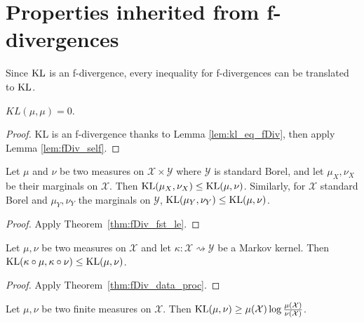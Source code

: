 \section{Properties inherited from f-divergences}

Since $\operatorname{KL}$ is an f-divergence, every inequality for f-divergences can be translated to $\operatorname{KL}$.

\begin{lemma}
  \label{lem:kl_self}
  \leanok
  $KL(\mu, \mu) = 0$.
\end{lemma}

\begin{proof} \leanok
  KL is an f-divergence thanks to Lemma \ref{lem:kl_eq_fDiv}, then apply Lemma \ref{lem:fDiv_self}.
\end{proof}

\begin{theorem}[Marginals]
  \label{thm:kl_fst_le}
  Let $\mu$ and $\nu$ be two measures on $\mathcal X \times \mathcal Y$ where $\mathcal Y$ is standard Borel, and let $\mu_X, \nu_X$ be their marginals on $\mathcal X$.
  Then $\operatorname{KL}(\mu_X, \nu_X) \le \operatorname{KL}(\mu, \nu)$.
  Similarly, for $\mathcal X$ standard Borel and $\mu_Y, \nu_Y$ the marginals on $\mathcal Y$, $\operatorname{KL}(\mu_Y, \nu_Y) \le \operatorname{KL}(\mu, \nu)$.
\end{theorem}

\begin{proof}
Apply Theorem~\ref{thm:fDiv_fst_le}.
\end{proof}

\begin{theorem}
  \label{thm:kl_data_proc}
  Let $\mu, \nu$ be two measures on $\mathcal X$ and let $\kappa : \mathcal X \rightsquigarrow \mathcal Y$ be a Markov kernel.
  Then $\operatorname{KL}(\kappa \circ \mu, \kappa \circ \nu) \le \operatorname{KL}(\mu, \nu)$.
\end{theorem}

\begin{proof}
Apply Theorem~\ref{thm:fDiv_data_proc}.
\end{proof}

\begin{lemma}
  \label{lem:kl_ge}
  \leanok
  Let $\mu, \nu$ be two finite measures on $\mathcal X$. Then $\operatorname{KL}(\mu, \nu) \ge \mu(\mathcal X) \log \frac{\mu(\mathcal X)}{\nu(\mathcal X)}$.
\end{lemma}

